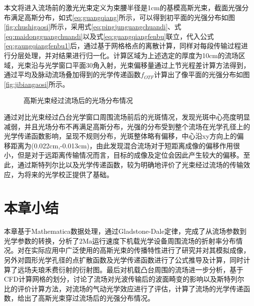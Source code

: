 本文将进入流场前的激光光束定义为束腰半径是1cm的基模高斯光束，截面光强分布满足高斯分布，如式\eqref{eq:guangqiang}所示，可以得到初平面的光强分布如图\ref{fig:chushigaosi}所示，采用式\eqref{eq:pingjunguangchuandi}、式\eqref{eq:maidongguangchuandi}以及式\eqref{eq:guangqiangfenbu}联立，代入公式\eqref{eq:gaungqiangfenbu1}后，通过基于网格格点的离散计算，同样对每段传输过程进行分层处理，并对结果进行归一化。计算区域为上述选定的厚度为10cm的流场区域，光束沿与光学窗口平面30\textdegree 角入射，光束偏移量通过上节光程差计算方法得到，通过平均及脉动流场叠加得到的光学传递函数$f_{OTF}$计算出了像平面的光强分布如图\ref{fig:jibiangaosi}所示。
\begin{figure}[bhtp]
\centering
{}
\caption{高斯光束经过流场后的光场分布情况}
\end{figure}

通过对比光束经过凸台光学窗口周围流场前后的光斑情况，发现光斑中心亮度明显减弱，并且光场分布不再满足高斯分布，光强的分布受到整个流场在光学孔径上的光学传递函数影响，呈现不规则分布，光斑整体略有偏移，中心沿xy方向上的偏移距离为(0.022cm,-0.013cm)，由此发现混合流场对于短距离成像的偏移作用很小，但是对于远距离传输情况而言，目标的成像及定位会因此产生较大的偏移。至此，通过斯特列尔比以及光学传递函数，较为明确地评价了光束经过流场的传输效应，为将来的光学校正提供了基础。
\section{本章小结}
本章基于Mathematica数据处理，通过Gladstone-Dale定律，完成了从流场参数到光学参数的转换，分析了2Ma运行速度下机载光学设备周围流场的折射率分布情况。对在实际应用中广泛使用的高斯光束的传播特性进行了研究并对其模拟成像，另外对圆形光学孔径的点扩散函数及光学传递函数进行了公式推导及计算，同时计算了远场夫琅禾费衍射的衍射图。最后对机载凸台周围的流场进一步分析，基于CFD计算网格的划分，讨论了流场对光波传输后的波面畸变的影响以及斯特列尔比的评价计算方法，对流场的气动光学效应进行了评估，计算了流场的光学传递函数，给出了高斯光束穿过流场后的光强分布情况。